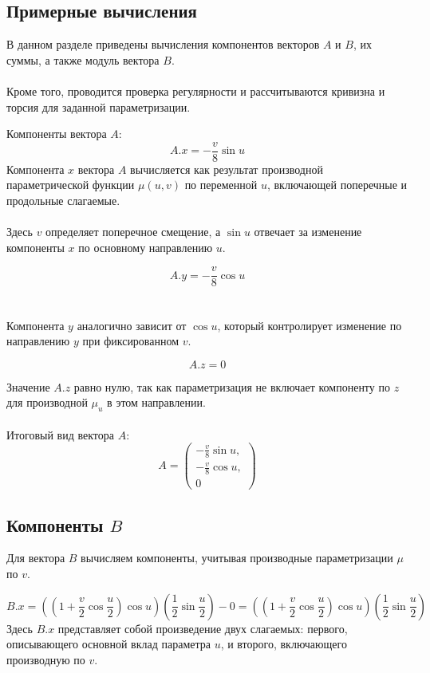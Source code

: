\documentclass{article}
\begin{document}
                
                \subsection*{Примерные вычисления}
        
        В данном разделе приведены вычисления компонентов векторов $A$ и $B$, их суммы, а также модуль вектора $B$. \\ \\Кроме того, проводится проверка регулярности и рассчитываются кривизна и торсия для заданной параметризации.
        
        Компоненты вектора $A$:
        \[
        A.x = -\frac{v}{8} \sin{u}
        \]
        Компонента $x$ вектора $A$ вычисляется как результат производной параметрической функции $\mu(u, v)$ по переменной $u$, включающей поперечные и продольные слагаемые.\\ \\ Здесь $v$ определяет поперечное смещение, а $\sin{u}$ отвечает за изменение компоненты $x$ по основному направлению $u$.
        
        \[
        A.y = -\frac{v}{8} \cos{u}
        \]\\ \\
        Компонента $y$ аналогично зависит от $\cos{u}$, который контролирует изменение по направлению $y$ при фиксированном $v$.
        
        \[
        A.z = 0
        \]
        
        Значение $A.z$ равно нулю, так как параметризация не включает компоненту по $z$ для производной $\mu_u$ в этом направлении.\\ \\
        Итоговый вид вектора $A$:
        \[
        A = \begin{pmatrix}
        -\frac{v}{8} \sin{u}, \\
        -\frac{v}{8} \cos{u}, \\
        0
        \end{pmatrix}
        \]
        
        \subsection*{Компоненты $B$}
        Для вектора $B$ вычисляем компоненты, учитывая производные параметризации $\mu$ по $v$.
        
        \[
        B.x = \left( \left( 1 + \frac{v}{2} \cos{\frac{u}{2}} \right) \cos{u} \right) 
        \left( \frac{1}{2} \sin{\frac{u}{2}} \right) - 0 = 
        \left( \left( 1 + \frac{v}{2} \cos{\frac{u}{2}} \right) \cos{u} \right) 
        \left( \frac{1}{2} \sin{\frac{u}{2}} \right)
        \]
        Здесь $B.x$ представляет собой произведение двух слагаемых: первого, описывающего основной вклад параметра $u$, и второго, включающего производную по $v$.
        
\end{document}
